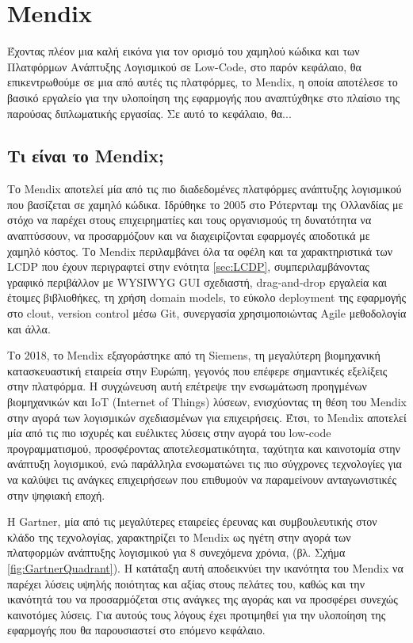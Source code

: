 \chapter{Mendix} \label{ch:mendix}
    Έχοντας πλέον μια καλή εικόνα για τον ορισμό του χαμηλού κώδικα και των Πλατφόρμων Ανάπτυξης Λογισμικού σε Low-Code, στο παρόν κεφάλαιο, θα επικεντρωθούμε σε μια από αυτές τις πλατφόρμες, το Mendix, η οποία αποτέλεσε το βασικό εργαλείο για την υλοποίηση της εφαρμογής που αναπτύχθηκε στο πλαίσιο της παρούσας διπλωματικής εργασίας.
    Σε αυτό το κεφάλαιο, θα...

    \section{Τι είναι το Mendix;}
        Το Mendix αποτελεί μία από τις πιο διαδεδομένες πλατφόρμες ανάπτυξης λογισμικού που βασίζεται σε χαμηλό κώδικα. Ιδρύθηκε το 2005 στο Ρότερνταμ της Ολλανδίας με στόχο να παρέχει στους επιχειρηματίες και τους οργανισμούς τη δυνατότητα να αναπτύσσουν, να προσαρμόζουν και να διαχειρίζονται εφαρμογές αποδοτικά με χαμηλό κόστος. Το Mendix περιλαμβάνει όλα τα οφέλη και τα χαρακτηριστικά των LCDP που έχουν περιγραφτεί στην ενότητα \ref{sec:LCDP}, συμπεριλαμβάνοντας γραφικό περιβάλλον με WYSIWYG GUI σχεδιαστή, drag-and-drop εργαλεία και έτοιμες βιβλιοθήκες, τη χρήση domain models, το εύκολο deployment της εφαρμογής στο clout, version control μέσω Git, συνεργασία χρησιμοποιώντας Agile μεθοδολογία και άλλα.

        Το 2018, το Mendix εξαγοράστηκε από τη Siemens, τη μεγαλύτερη βιομηχανική κατασκευαστική εταιρεία στην Ευρώπη, γεγονός που επέφερε σημαντικές εξελίξεις στην πλατφόρμα. Η συγχώνευση αυτή επέτρεψε την ενσωμάτωση προηγμένων βιομηχανικών και IoT (Internet of Things) λύσεων, ενισχύοντας τη θέση του Mendix στην αγορά των λογισμικών σχεδιασμένων για επιχειρήσεις. Έτσι, το Mendix αποτελεί μία από τις πιο ισχυρές και ευέλικτες λύσεις στην αγορά του low-code προγραμματισμού, προσφέροντας αποτελεσματικότητα, ταχύτητα και καινοτομία στην ανάπτυξη λογισμικού, ενώ παράλληλα ενσωματώνει τις πιο σύγχρονες τεχνολογίες για να καλύψει τις ανάγκες επιχειρήσεων που επιθυμούν να παραμείνουν ανταγωνιστικές στην ψηφιακή εποχή. \cite{LowCodeMendix}

        Η Gartner, μία από τις μεγαλύτερες εταιρείες έρευνας και συμβουλευτικής στον κλάδο της τεχνολογίας, χαρακτηρίζει το Mendix ως ηγέτη στην αγορά των πλατφορμών ανάπτυξης λογισμικού για 8 συνεχόμενα χρόνια, (βλ. Σχήμα \ref{fig:GartnerQuadrant}). Η κατάταξη αυτή αποδεικνύει την ικανότητα του Mendix να παρέχει λύσεις υψηλής ποιότητας και αξίας στους πελάτες του, καθώς και την ικανότητά του να προσαρμόζεται στις ανάγκες της αγοράς και να προσφέρει συνεχώς καινοτόμες λύσεις. \cite{mendixGartnerQuadrant} Για αυτούς τους λόγους έχει προτιμηθεί για την υλοποίηση της εφαρμογής που θα παρουσιαστεί στο επόμενο κεφάλαιο.

